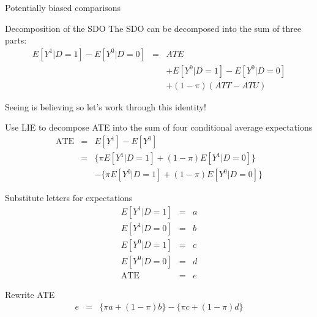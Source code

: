 \documentclass{beamer}
\begin{document}
\begin{frame}{Potentially biased comparisons}

  \begin{block}{Decomposition of the SDO}
    The SDO can be decomposed into the sum of three parts:
    \begin{eqnarray*}
      E[Y^1 | D=1] - E[Y^0 | D=0]&=& ATE\nonumber \\
      &&+ E[Y^0|D=1] - E[Y^0|D=0] \nonumber \\
      && + (1-\pi)(ATT - ATU)
    \end{eqnarray*}
  \end{block}
  Seeing is believing so let's work through this identity!

\end{frame}


\begin{frame}[shrink=20,plain]

  \begin{block}{Use LIE to decompose ATE into the sum of four conditional average expectations}
    \begin{eqnarray*}
      \text{ATE}&=&E[Y^1]-E[Y^0]  \\
      &=& \{\pi E[Y^1 | D=1] + (1-\pi)E[Y^1 | D=0]\}  \\
      & & - \{\pi E[Y^0|D=1] + (1-\pi) E[Y^0 | D=0]\}
    \end{eqnarray*}
  \end{block}


  \begin{block}{Substitute letters for expectations}
    \begin{eqnarray*}
      E[Y^1|D=1] &=& a  \\
      E[Y^1|D=0] &=& b  \\
      E[Y^0|D=1] &=& c  \\
      E[Y^0|D=0] &=& d  \\
      \text{ATE} &=& e
    \end{eqnarray*}
  \end{block}

  \begin{block}{Rewrite ATE}
    \begin{eqnarray*}
      e&=&\{\pi{a} + (1-\pi)b\} - \{\pi{c} + (1-\pi)d\}
    \end{eqnarray*}
  \end{block}

\end{frame}
\end{document}
